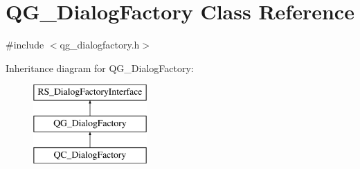 \hypertarget{classQG__DialogFactory}{\section{Q\-G\-\_\-\-Dialog\-Factory Class Reference}
\label{classQG__DialogFactory}
}


{\ttfamily \#include $<$qg\-\_\-dialogfactory.\-h$>$}

Inheritance diagram for Q\-G\-\_\-\-Dialog\-Factory\-:\begin{figure}[H]
\begin{center}
\leavevmode
\includegraphics[height=3.000000cm]{classQG__DialogFactory}
\end{center}
\end{figure}
